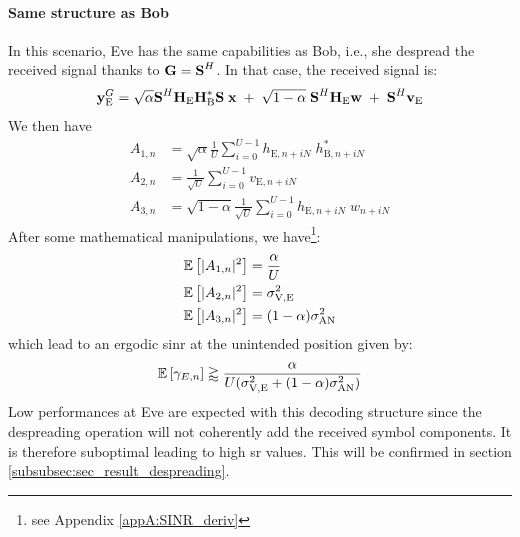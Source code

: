 \paragraph{Same structure as Bob}
\label{par:eve_same_bob}
In this scenario, Eve has the same capabilities as Bob, i.e., she despread the received signal thanks to $\textbf{G}=\textbf{S}^H$. In that case, the received signal is:
\begin{equation}
    \textbf{y}_{\text{E}}^G = \sqrt{\alpha} \textbf{S}^H \textbf{H}_{\text{E}} \textbf{H}^*_{\text{B}} \textbf{S}\; \textbf{x} \; +  \; \sqrt{1-\alpha} \; \textbf{S}^H \textbf{H}_{\text{E}} \textbf{w}  \; +  \; \textbf{S}^H  \textbf{v}_{\text{E}} 
    \label{eq:rx_eve_filt0}
\end{equation}
We then have 
\begin{equation}
    \begin{split}
        A_{1,n} &= \sqrt{\alpha}\frac{1}{U}\sum_{i=0}^{U-1}  h_{\text{E}, n + iN} \; h^*_{\text{B}, n + iN} \\
        A_{2,n} &= \frac{1}{\sqrt{U}}\sum_{i=0}^{U-1}  v_{\text{E}, n + iN}\\
        A_{3,n} &= \sqrt{1-\alpha}\frac{1}{\sqrt{U}}\sum_{i=0}^{U-1}  h_{\text{E}, n + iN} \; w_{n + iN}
    \end{split}
\end{equation}
After some mathematical manipulations, we have\footnote{see Appendix  \ref{appA:SINR_deriv}}:
\begin{equation}
    \begin{split}
        &\mathbb{E} \left[|A_{1,n}|^2\right] = \frac{\alpha}{U} \\
        &\mathbb{E} \left[|A_{2,n}|^2\right] = \sigma^2_{\text{V,E}}\\
        &\mathbb{E} \left[|A_{3,n}|^2\right] = (1-\alpha)\sigma^2_{\text{AN}}
    \end{split}
    \label{eq:expected_eve_filt0}
\end{equation}
which lead to an ergodic \gls{sinr} at the unintended position given by:
\begin{equation}
    \mathbb{E} \left[\gamma_{E,n}\right] \gtrapprox \frac{\alpha}{U(\sigma^2_{\text{V,E}}+(1-\alpha)\sigma^2_{\text{AN}})}
    \label{eq:sinr_eve_filt0}
\end{equation}
Low performances at Eve are expected with this decoding structure since the despreading operation will not coherently add the received symbol components. It is therefore suboptimal leading to high \gls{sr} values. This will be confirmed in section \ref{subsubsec:sec_result_despreading}.



